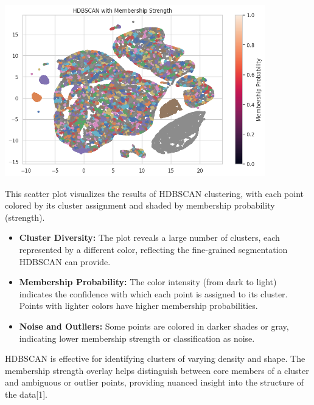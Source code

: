 \documentclass[a4paper]{article}
\begin{document}
\begin{multicols}{2}
\noindent
\begin{minipage}{\columnwidth}
\centering
\includegraphics[width=0.85\textwidth]{plots/HDBSCAN with Membership Strength.png}
\label{fig:hdbscan_membership}
\end{minipage}

This scatter plot visualizes the results of HDBSCAN clustering, with each point colored by its cluster assignment and shaded by membership probability (strength).

\begin{itemize}
    \item \textbf{Cluster Diversity:} The plot reveals a large number of clusters, each represented by a different color, reflecting the fine-grained segmentation HDBSCAN can provide.
    \item \textbf{Membership Probability:} The color intensity (from dark to light) indicates the confidence with which each point is assigned to its cluster. Points with lighter colors have higher membership probabilities.
    \item \textbf{Noise and Outliers:} Some points are colored in darker shades or gray, indicating lower membership strength or classification as noise.
\end{itemize}

HDBSCAN is effective for identifying clusters of varying density and shape. The membership strength overlay helps distinguish between core members of a cluster and ambiguous or outlier points, providing nuanced insight into the structure of the data[1].

\vspace{1em}


\end{multicols}
\end{document}
